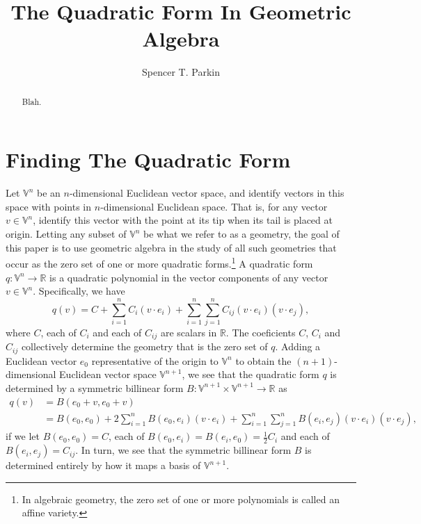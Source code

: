 \documentclass{birkjour}
\theoremstyle{definition}
\theoremstyle{remark}
\numberwithin{equation}{section}
\newcommand{\V}{\mathbb{V}}
\newcommand{\R}{\mathbb{R}}
\begin{document}
\title{The Quadratic Form In Geometric Algebra}

\author{Spencer T. Parkin}





\begin{abstract}
Blah.
\end{abstract}

\maketitle


\section{Finding The Quadratic Form}

Let $\V^n$ be an $n$-dimensional Euclidean vector space, and identify vectors
in this space with points in $n$-dimensional Euclidean space.  That is,
for any vector $v\in\V^n$, identify this vector with the point at its tip when
its tail is placed at origin.  Letting any subset of $\V^n$ be what we refer to
as a geometry, the goal of this paper is to use geometric algebra in the study of all
such geometries that occur as the zero set of one or more quadratic forms.\footnote{In
algebraic geometry, the zero set of one or more polynomials is called an affine variety.}
A quadratic form $q:\V^n\to\R$ is a quadratic polynomial in the vector components of any
vector $v\in\V^n$.  Specifically, we have
\begin{equation}\label{equ_quadratic_form}
q(v) = C + \sum_{i=1}^n C_i(v\cdot e_i) + \sum_{i=1}^n\sum_{j=1}^n C_{ij}(v\cdot e_i)(v\cdot e_j),
\end{equation}
where $C$, each of $C_i$ and each of $C_{ij}$ are scalars in $\R$.  The coeficients $C$, $C_i$ and $C_{ij}$ collectively determine the geometry that is the zero set of $q$.  Adding a Euclidean vector $e_0$
representative of the origin to $\V^n$ to obtain the $(n+1)$-dimensional Euclidean
vector space $\V^{n+1}$, we see that the quadratic form $q$ is determined by a
symmetric billinear form $B:\V^{n+1}\times\V^{n+1}\to\R$ as
\begin{align}
q(v) &= B(e_0+v,e_0+v) \\
 &= B(e_0,e_0)+2\sum_{i=1}^n B(e_0,e_i)(v\cdot e_i)
 + \sum_{i=1}^n\sum_{j=1}^n B(e_i,e_j)(v\cdot e_i)(v\cdot e_j),
\end{align}
if we let $B(e_0,e_0)=C$, each of $B(e_0,e_i)=B(e_i,e_0)=\frac{1}{2}C_i$ and each of
$B(e_i,e_j)=C_{ij}$.
In turn, we see that the symmetric billinear form $B$ is determined entirely by how it
maps a basis of $\V^{n+1}$.
\end{document}
